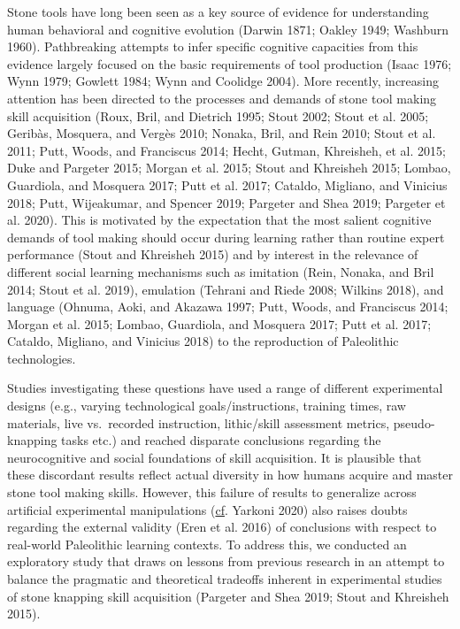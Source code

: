 \documentclass[smallextended]{svjour3}       %
\begin{document}
Stone tools have long been seen as a key source of evidence for
understanding human behavioral and cognitive evolution (Darwin 1871;
Oakley 1949; Washburn 1960). Pathbreaking attempts to infer specific
cognitive capacities from this evidence largely focused on the basic
requirements of tool production (Isaac 1976; Wynn 1979; Gowlett 1984;
Wynn and Coolidge 2004). More recently, increasing attention has been
directed to the processes and demands of stone tool making skill
acquisition (Roux, Bril, and Dietrich 1995; Stout 2002; Stout et al.
2005; Geribàs, Mosquera, and Vergès 2010; Nonaka, Bril, and Rein 2010;
Stout et al. 2011; Putt, Woods, and Franciscus 2014; Hecht, Gutman,
Khreisheh, et al. 2015; Duke and Pargeter 2015; Morgan et al. 2015;
Stout and Khreisheh 2015; Lombao, Guardiola, and Mosquera 2017; Putt et
al. 2017; Cataldo, Migliano, and Vinicius 2018; Putt, Wijeakumar, and
Spencer 2019; Pargeter and Shea 2019; Pargeter et al. 2020). This is
motivated by the expectation that the most salient cognitive demands of
tool making should occur during learning rather than routine expert
performance (Stout and Khreisheh 2015) and by interest in the relevance
of different social learning mechanisms such as imitation (Rein, Nonaka,
and Bril 2014; Stout et al. 2019), emulation (Tehrani and Riede 2008;
Wilkins 2018), and language (Ohnuma, Aoki, and Akazawa 1997; Putt,
Woods, and Franciscus 2014; Morgan et al. 2015; Lombao, Guardiola, and
Mosquera 2017; Putt et al. 2017; Cataldo, Migliano, and Vinicius 2018)
to the reproduction of Paleolithic technologies.

Studies investigating these questions have used a range of different
experimental designs (e.g., varying technological goals/instructions,
training times, raw materials, live vs.~recorded instruction,
lithic/skill assessment metrics, pseudo-knapping tasks etc.) and reached
disparate conclusions regarding the neurocognitive and social
foundations of skill acquisition. It is plausible that these discordant
results reflect actual diversity in how humans acquire and master stone
tool making skills. However, this failure of results to generalize
across artificial experimental manipulations
(\href{cf.\%20Yarkoni\%202020}{cf}. Yarkoni 2020) also raises doubts
regarding the external validity (Eren et al. 2016) of conclusions with
respect to real-world Paleolithic learning contexts. To address this, we
conducted an exploratory study that draws on lessons from previous
research in an attempt to balance the pragmatic and theoretical
tradeoffs inherent in experimental studies of stone knapping skill
acquisition (Pargeter and Shea 2019; Stout and Khreisheh 2015).
\end{document}
